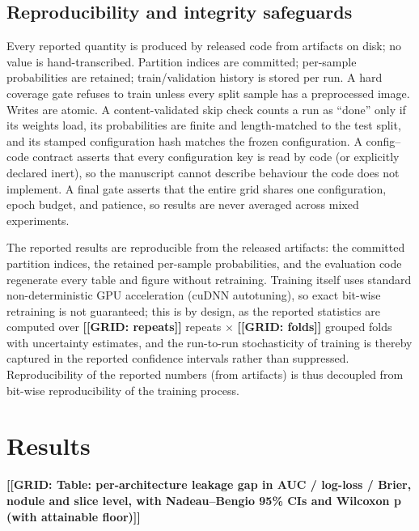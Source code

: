 \documentclass{article}
\newcommand{\gridnum}[1]{{\color{red}\textbf{[[GRID: #1]]}}}
\begin{document}
\subsection{Reproducibility and integrity safeguards}\label{sec:repro}
Every reported quantity is produced by released code from artifacts on disk; no value is
hand-transcribed. Partition indices are committed; per-sample probabilities are retained;
train/validation history is stored per run. A hard coverage gate refuses to train unless every
split sample has a preprocessed image. Writes are atomic. A content-validated skip check counts a
run as ``done'' only if its weights load, its probabilities are finite and length-matched to the
test split, and its stamped configuration hash matches the frozen configuration. A config--code
contract asserts that every configuration key is read by code (or explicitly declared inert), so
the manuscript cannot describe behaviour the code does not implement. A final gate asserts that the
entire grid shares one configuration, epoch budget, and patience, so results are never averaged
across mixed experiments.

The reported results are reproducible from the released artifacts: the committed partition indices,
the retained per-sample probabilities, and the evaluation code regenerate every table and figure
without retraining. Training itself uses standard non-deterministic GPU acceleration (cuDNN
autotuning), so exact bit-wise retraining is not guaranteed; this is by design, as the reported
statistics are computed over \gridnum{repeats} repeats $\times$ \gridnum{folds} grouped folds with
uncertainty estimates, and the run-to-run stochasticity of training is thereby captured in the
reported confidence intervals rather than suppressed. Reproducibility of the reported numbers
(from artifacts) is thus decoupled from bit-wise reproducibility of the training process.

\section{Results}
\gridnum{Table: per-architecture leakage gap in AUC / log-loss / Brier, nodule and slice level,
with Nadeau--Bengio 95\% CIs and Wilcoxon p (with attainable floor)}
\end{document}
